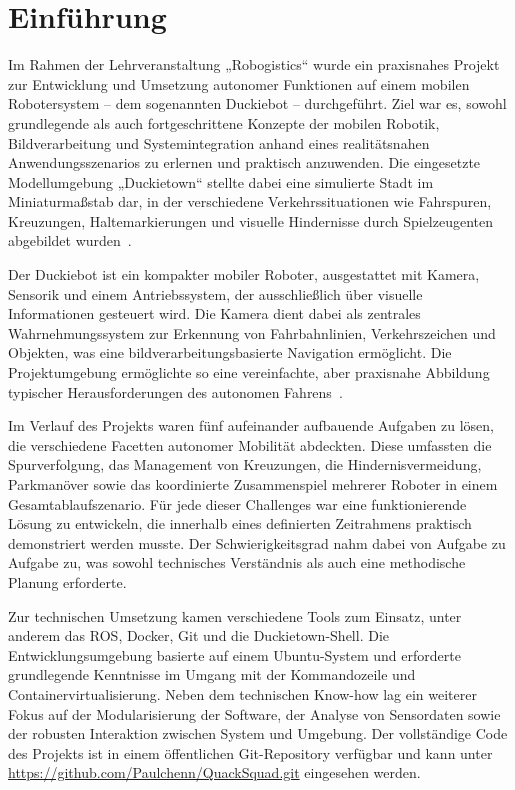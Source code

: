 \chapter{Einführung}
\label{ch:Einfuehrung}

Im Rahmen der Lehrveranstaltung „Robogistics“ wurde ein praxisnahes Projekt zur Entwicklung und Umsetzung 
autonomer Funktionen auf einem mobilen Robotersystem – dem sogenannten Duckiebot – durchgeführt. Ziel war es, 
sowohl grundlegende als auch fortgeschrittene Konzepte der mobilen Robotik, Bildverarbeitung und Systemintegration
anhand eines realitätsnahen Anwendungsszenarios zu erlernen und praktisch anzuwenden. Die eingesetzte
Modellumgebung „Duckietown“ stellte dabei eine simulierte Stadt im Miniaturmaßstab dar, in der verschiedene 
Verkehrssituationen wie Fahrspuren, Kreuzungen, Haltemarkierungen und visuelle Hindernisse durch Spielzeugenten 
abgebildet wurden~\cite{wurll2025}. 

Der Duckiebot ist ein kompakter mobiler Roboter, ausgestattet mit Kamera, Sensorik und einem Antriebssystem, 
der ausschließlich über visuelle Informationen gesteuert wird. Die Kamera dient dabei als zentrales 
Wahrnehmungssystem zur Erkennung von Fahrbahnlinien, Verkehrszeichen und Objekten, was eine 
bildverarbeitungsbasierte Navigation ermöglicht. Die Projektumgebung ermöglichte so eine vereinfachte, 
aber praxisnahe Abbildung typischer Herausforderungen des autonomen Fahrens~\cite{duckiebot2025}. 

Im Verlauf des Projekts waren fünf aufeinander aufbauende Aufgaben zu lösen, die verschiedene Facetten 
autonomer Mobilität abdeckten. Diese umfassten die Spurverfolgung, das Management von Kreuzungen, die 
Hindernisvermeidung, Parkmanöver sowie das koordinierte Zusammenspiel mehrerer Roboter in einem 
Gesamtablaufszenario. Für jede dieser Challenges war eine funktionierende Lösung zu entwickeln, die 
innerhalb eines definierten Zeitrahmens praktisch demonstriert werden musste. Der Schwierigkeitsgrad nahm 
dabei von Aufgabe zu Aufgabe zu, was sowohl technisches Verständnis als auch eine methodische Planung erforderte. 

Zur technischen Umsetzung kamen verschiedene Tools zum Einsatz, unter anderem das \ac{ROS}, 
Docker, Git und die Duckietown-Shell. Die Entwicklungsumgebung basierte auf einem Ubuntu-System und erforderte
grundlegende Kenntnisse im Umgang mit der Kommandozeile und Containervirtualisierung. Neben dem technischen 
Know-how lag ein weiterer Fokus auf der Modularisierung der Software, der Analyse von Sensordaten sowie der 
robusten Interaktion zwischen System und Umgebung. Der vollständige Code des Projekts ist in einem öffentlichen Git-Repository verfügbar und kann unter \url{https://github.com/Paulchenn/QuackSquad.git} eingesehen werden.

